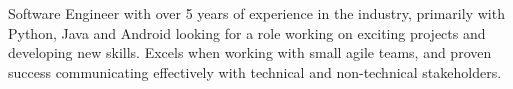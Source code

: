 \begin{cvletter}

Software Engineer with over 5 years of experience in the industry, primarily with Python, Java and Android looking for a role working on exciting projects and developing new skills. Excels when working with small agile teams, and proven success communicating effectively with technical and non-technical stakeholders.
\end{cvletter}


